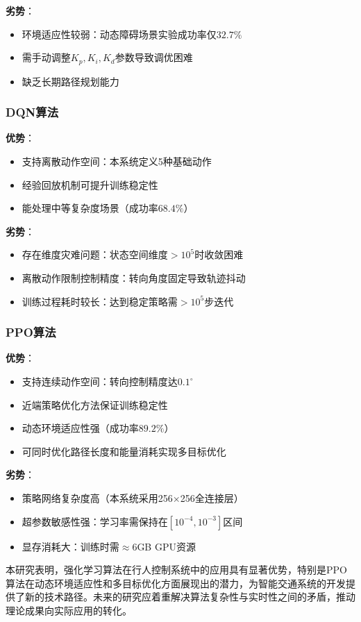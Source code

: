 \textbf{劣势}：
\begin{itemize}
  \item 环境适应性较弱：动态障碍场景实验成功率仅$32.7\%$
  \item 需手动调整$K_p,K_i,K_d$参数导致调优困难
  \item 缺乏长期路径规划能力
\end{itemize}

\subsubsection{DQN算法}
\label{subsubsec:dqn_analysis}

\textbf{优势}：
\begin{itemize}
  \item 支持离散动作空间：本系统定义5种基础动作
  \item 经验回放机制可提升训练稳定性
  \item 能处理中等复杂度场景（成功率$68.4\%$）
\end{itemize}

\textbf{劣势}：
\begin{itemize}
  \item 存在维度灾难问题：状态空间维度$>10^5$时收敛困难
  \item 离散动作限制控制精度：转向角度固定导致轨迹抖动
  \item 训练过程耗时较长：达到稳定策略需$>10^5$步迭代
\end{itemize}

\subsubsection{PPO算法}
\label{subsubsec:ppo_analysis}

\textbf{优势}：
\begin{itemize}
  \item 支持连续动作空间：转向控制精度达$0.1^\circ$
  \item 近端策略优化方法保证训练稳定性
  \item 动态环境适应性强（成功率$89.2\%$）
  \item 可同时优化路径长度和能量消耗实现多目标优化
\end{itemize}

\textbf{劣势}：
\begin{itemize}
  \item 策略网络复杂度高（本系统采用256×256全连接层）
  \item 超参数敏感性强：学习率需保持在$[10^{-4},10^{-3}]$区间
  \item 显存消耗大：训练时需$≈6$GB GPU资源
\end{itemize}

本研究表明，强化学习算法在行人控制系统中的应用具有显著优势，特别是PPO算法在动态环境适应性和多目标优化方面展现出的潜力，为智能交通系统的开发提供了新的技术路径。未来的研究应着重解决算法复杂性与实时性之间的矛盾，推动理论成果向实际应用的转化。
